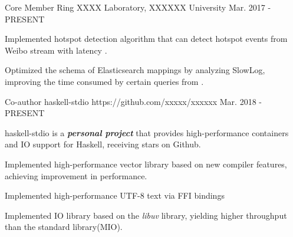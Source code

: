 


\begin{cventries}


\cventry
{Core Member} %
{Ring} %
{XXXX Laboratory, XXXXXX University} %
{Mar. 2017 - PRESENT} %
{ %
    \begin{cvitems}
        \item {Implemented hotspot detection algorithm that can detect hotspot events from Weibo stream with latency .}
        \item {Optimized the schema of Elasticsearch mappings by analyzing SlowLog, improving the time consumed by certain queries from .}
    \end{cvitems}
}

\vspace{-5mm}

\cventry
{Co-author} %
{haskell-stdio} %
{https://github.com/xxxxx/xxxxxx} %
{Mar. 2018 - PRESENT} %
{ %
    \begin{cvitems}
    	\item {haskell-stdio is a \textit{\textbf{personal project}} that provides high-performance containers and IO support for Haskell, receiving  stars on Github.}
        \item {Implemented high-performance vector library based on new compiler features, achieving  improvement in performance.}
        \item {Implemented high-performance UTF-8 text via FFI bindings}
        \item {Implemented IO library based on the \textit{libuv} library, yielding  higher throughput than the standard library(MIO).}
    \end{cvitems}
}


\end{cventries}
